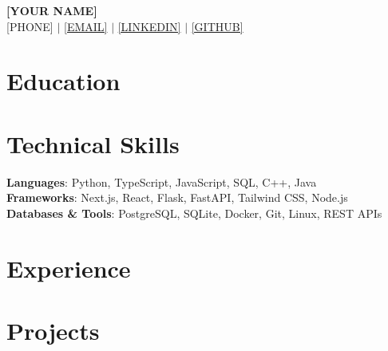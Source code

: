 \documentclass[letterpaper,10pt]{article}
\begin{document}
\begin{center}
    \textbf{\Huge \scshape [YOUR NAME]} \\ \vspace{1pt}
    \small [PHONE] $|$ \href{mailto:[EMAIL]}{[EMAIL]} $|$ 
    \href{[LINKEDIN_URL]}{[LINKEDIN]} $|$
    \href{[GITHUB_URL]}{[GITHUB]}
\end{center}

\section{Education}

\section{Technical Skills}
\begin{itemize}[leftmargin=0.15in, label={}]
    \small{\item{
     \textbf{Languages}{: Python, TypeScript, JavaScript, SQL, C++, Java} \\
     \textbf{Frameworks}{: Next.js, React, Flask, FastAPI, Tailwind CSS, Node.js} \\
     \textbf{Databases \& Tools}{: PostgreSQL, SQLite, Docker, Git, Linux, REST APIs}
    }}
\end{itemize}

\section{Experience}

\section{Projects}
\end{document}
